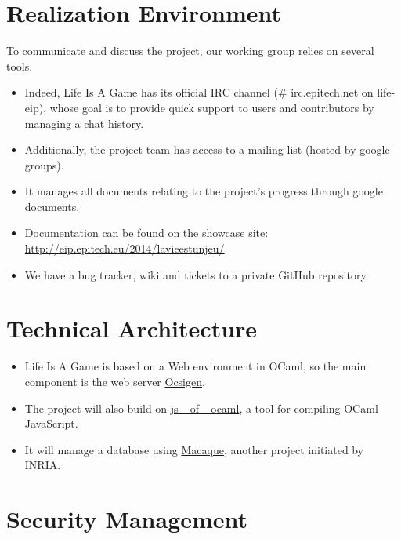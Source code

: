 \documentclass{life-fr}
\begin{document}
\section{Realization Environment}

To communicate and discuss the project, our working group relies on several tools.

\begin{itemize}
  \item Indeed, Life Is A Game has its official IRC channel (\# irc.epitech.net on life-eip), whose goal is to provide quick support to users and contributors by managing a chat history.
  \item Additionally, the project team has access to a mailing list (hosted by google groups).
  \item It manages all documents relating to the project's progress through google documents.
  \item Documentation can be found on the showcase site: \url {http://eip.epitech.eu/2014/lavieestunjeu/}
  \item We have a bug tracker, wiki and tickets to a private GitHub repository.
\end{itemize}

\section{Technical Architecture}

\begin{itemize}
  \item Life Is A Game is based on a Web environment in OCaml, so the main component is the web server \href{http://ocsigen.org/}{Ocsigen}.
  \item The project will also build on \href {http://ocsigen.org/js_of_ocaml/}{js \_of \_ocaml}, a tool for compiling OCaml JavaScript.
  \item It will manage a database using \href {http://ocsigen.org/macaque/}{Macaque}, another project initiated by INRIA.
\end{itemize}

\section{Security Management}
\end{document}
